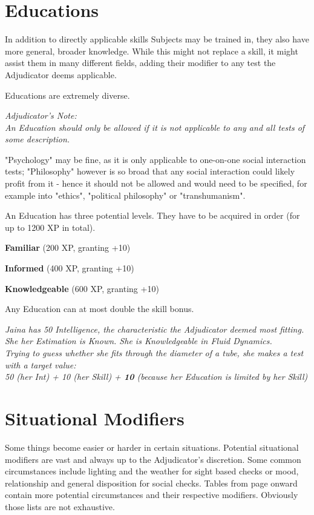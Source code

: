 \documentclass[11pt,a4paper,openany,dvipsnames]{book}
\begin{document}
	\section{Educations}
	\label{eds-explanation}
	In addition to directly applicable skills Subjects may be trained in,
		they also have more general, broader knowledge.
	While this might not replace a skill,
		it might assist them in many different fields,
		adding their modifier to any test the Adjudicator deems applicable.
	\par%
	Educations are extremely diverse.
	\begin{exampleblock}
		\itshape
		Adjudicator's Note:
		\\%
		An Education should only be allowed
			if it is not applicable to any and all tests of some description.
		\par%
		"Psychology" may be fine,
			as it is only applicable to one-on-one social interaction tests;
		"Philosophy" however is so broad
			that any social interaction could likely profit from it
			- hence it should not be allowed and would need to be specified,
			for example into "ethics", "political philosophy" or "transhumanism".
	\end{exampleblock}
	\newcommand{\edlevelinfo}{
		An Education has three potential levels.
		They have to be acquired in order
		(for up to 1200 XP in total).
		\begin{sitemize}
			\item \textbf{Familiar} (200 XP, granting +10)
			\item \textbf{Informed} (400 XP, granting +10)
			\item \textbf{Knowledgeable} (600 XP, granting +10)
		\end{sitemize}
	}
	\edlevelinfo
	Any Education can at most double the skill bonus.
	\begin{exampleblock}
		\itshape
		Jaina has 50 Intelligence, the characteristic the Adjudicator deemed most fitting.
		She her \emph{Estimation} is \emph{Known}.
		She is \emph{Knowledgeable} in \emph{Fluid Dynamics}.
		\\%
		Trying to guess whether she fits through the diameter of a tube,
			she makes a test with a target value:
		\\%
			50 (her Int) + 10 (her Skill) + \textbf{10} (because her Education is limited by her Skill)
	\end{exampleblock}
	\section{Situational Modifiers}
	Some things become easier or harder in certain situations.
	Potential situational modifiers are vast and always up to the Adjudicator's discretion.
	Some common circumstances include
		lighting and the weather for sight based checks or
		mood, relationship and general disposition for social checks.
	Tables from page \pageref{situationalmodifiers} onward contain
		more potential circumstances and their respective modifiers.
	Obviously those lists are not exhaustive.
\end{document}
